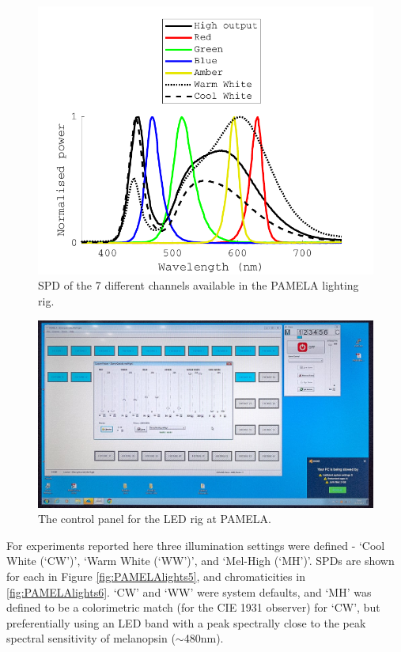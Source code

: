\begin{figure}[hbtp]
\includegraphics[max width=\textwidth]{figs/tablet/PAMELA_SPD.pdf}
\caption{\gls{SPD} of the 7 different channels available in the \gls{PAMELA} lighting rig.}
\label{fig:PAMELAlights2}
\end{figure}

\begin{figure}[hbtp]
\includegraphics[max width=\textwidth]{figs/tablet/PAMELA_screenshot.jpg}
\caption{The control panel for the LED rig at \gls{PAMELA}.}
\label{fig:PAMELAlights4}
\end{figure}

For experiments reported here three illumination settings were defined - `Cool White (`CW')', `Warm White (`WW')', and `Mel-High (`MH')'. \gls{SPD}s are shown for each in Figure \ref{fig:PAMELAlights5}, and chromaticities in \ref{fig:PAMELAlights6}. `CW' and `WW' were system defaults, and `MH' was defined to be a colorimetric match (for the CIE 1931 observer) for `CW', but preferentially using an \gls{LED} band with a peak spectrally close to the peak spectral sensitivity of melanopsin ($\sim$480nm).

